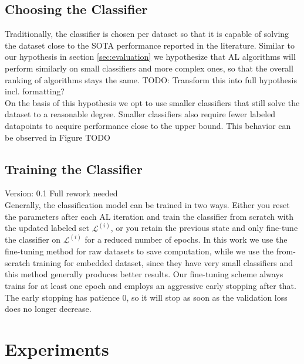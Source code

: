 \documentclass[]{article}
\begin{document}
\subsection{Choosing the Classifier}\label{sec:choosing_the_classifier}
Traditionally, the classifier is chosen per dataset so that it is capable of solving the dataset close to the SOTA performance reported in the literature.
Similar to our hypothesis in section \ref{sec:evaluation} we hypothesize that AL algorithms will perform similarly on small classifiers and more complex ones, so that the overall ranking of algorithms stays the same.
{\color{red} TODO: Transform this into full hypothesis incl. formatting?}\\
On the basis of this hypothesis we opt to use smaller classifiers that still solve the dataset to a reasonable degree.
Smaller classifiers also require fewer labeled datapoints to acquire performance close to the upper bound.
This behavior can be observed in Figure {\color{red} TODO}

\subsection{Training the Classifier}\label{sec:training_the_classifier}
{\color{red} Version: 0.1 Full rework needed}\\
Generally, the classification model can be trained in two ways. Either you reset the parameters after each AL iteration and train the classifier from scratch with the updated labeled set $\mathcal{L}^{(i)}$, or you retain the previous state and only fine-tune the classifier on $\mathcal{L}^{(i)}$ for a reduced number of epochs.
In this work we use the fine-tuning method for raw datasets to save computation, while we use the from-scratch training for embedded dataset, since they have very small classifiers and this method generally produces better results.
Our fine-tuning scheme always trains for at least one epoch and employs an aggressive early stopping after that.
The early stopping has patience 0, so it will stop as soon as the validation loss does no longer decrease.

\section{Experiments}
\end{document}

